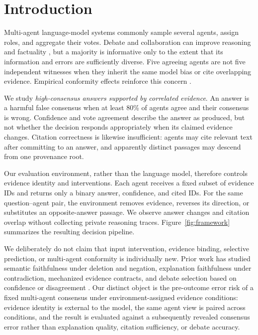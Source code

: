 \documentclass[11pt]{article}
\begin{document}
\section{Introduction}

Multi-agent language-model systems commonly sample several agents, assign roles, and aggregate their votes. Debate and collaboration can improve reasoning and factuality \citep{du2023multiagent,liang2023divergent}, but a majority is informative only to the extent that its information and errors are sufficiently diverse. Five agreeing agents are not five independent witnesses when they inherit the same model bias or cite overlapping evidence. Empirical conformity effects reinforce this concern \citep{choi2025conformity}.

We study \emph{high-consensus answers supported by correlated evidence}. An answer is a harmful false consensus when at least 80\% of agents agree and their consensus is wrong. Confidence and vote agreement describe the answer as produced, but not whether the decision responds appropriately when its claimed evidence changes. Citation correctness is likewise insufficient: agents may cite relevant text after committing to an answer, and apparently distinct passages may descend from one provenance root.

Our evaluation environment, rather than the language model, therefore controls evidence identity and interventions. Each agent receives a fixed subset of evidence IDs and returns only a binary answer, confidence, and cited IDs. For the same question--agent pair, the environment removes evidence, reverses its direction, or substitutes an opposite-answer passage. We observe answer changes and citation overlap without collecting private reasoning traces. Figure~\ref{fig:framework} summarizes the resulting decision pipeline.

We deliberately do not claim that input intervention, evidence binding, selective prediction, or multi-agent conformity is individually new. Prior work has studied semantic faithfulness under deletion and negation, explanation faithfulness under contradiction, mechanized evidence contracts, and debate selection based on confidence or disagreement \citep{chaturvedi-etal-2024-analyzing,chuang-etal-2026-faithlm,xu-etal-2026-gavel,verma-etal-2026-selene}. Our distinct object is the pre-outcome error risk of a fixed multi-agent consensus under environment-assigned evidence conditions: evidence identity is external to the model, the same agent view is paired across conditions, and the result is evaluated against a subsequently revealed consensus error rather than explanation quality, citation sufficiency, or debate accuracy.
\end{document}
